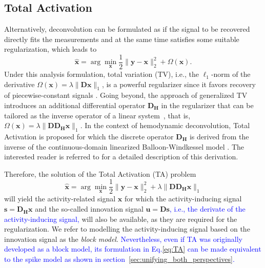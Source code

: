 \subsection{Total Activation}
Alternatively, deconvolution can be formulated as if the signal to be recovered
directly fits the measurements and at the same time satisfies some suitable
regularization, which leads to
\begin{equation}
\label{eq:analysis_model}
    \hat{\mathbf{x}} = \arg \min_{\mathbf{x}} \frac{1}{2} \| \mathbf{y} - \mathbf{x} \|_2^2 + \Omega(\mathbf{x}).
\end{equation}
Under this analysis formulation, total variation (TV), i.e., the $\ell_1$-norm
of the derivative $\Omega(\mathbf{x})=\lambda \|\mathbf{Dx}\|_1$, is a powerful
regularizer since it favors recovery of piecewise-constant signals
\citep{Chambolle2004TotalVariation}. Going beyond, the approach of generalized
TV introduces an additional differential operator $\mathbf{D_H}$ in the
regularizer that can be tailored as the inverse operator of a linear
system~\citep{Karahanoglu2011SignalProcessingApproach}, that is,
$\Omega(\mathbf{x})=\lambda \|\mathbf{D D_H x}\|_1$. In the context of
hemodynamic deconvolution, Total Activation is proposed for which the discrete
operator $\mathbf{D_H}$ is derived from the inverse of the continuous-domain
linearized Balloon-Windkessel model
\citep{Buxton1998BalloonModel,Friston2000Nonlinear-Balloon}. %
The interested reader is referred to
\citep{Khalidov2011ActiveletsWaveletssparse,Karahanoglu2011SignalProcessingApproach,
Karahanoglu2013TotalactivationfMRI} for a detailed description of this
derivation. 

Therefore, the solution of the Total Activation (TA) problem
\begin{equation}
\label{eq:TA}
    \hat{\mathbf{x}} = \arg \min_{\mathbf{x}} \frac{1}{2} \| \mathbf{y} - \mathbf{x} \|_2^2 + \lambda \|\mathbf{D D_H x} \|_1
\end{equation}
will yield the activity-related signal $\mathbf{x}$ for which the
activity-inducing signal $\mathbf{s}=\mathbf{D_H x}$ and the so-called
innovation signal $\mathbf{u}=\mathbf{Ds}$\textcolor{blue}{, i.e., the derivate
of the activity-inducing signal,} will also be available, as they are required
for the regularization. We refer to modelling the activity-inducing signal based
on the innovation signal as the \textit{block model}.
\textcolor{blue}{Nevertheless, even if TA was originally developed as a block
model, its formulation in Eq.\eqref{eq:TA} can be made equivalent to the spike
model as shown in section~\ref{sec:unifying_both_perspectives}.}


